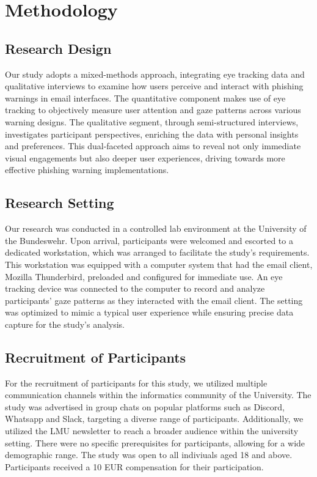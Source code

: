 \documentclass[
  a4paper,  %
  twoside,  %
  bibliography=totoc,
  headsepline,
  cleardoublepage=empty,
  parskip=half,
  draft=false
]{scrbook}
\begin{document}
\chapter{Methodology}
\label{sec:methodology}
\section{Research Design}
Our study adopts a mixed-methods approach, integrating eye tracking data and qualitative interviews to examine how users perceive and interact with phishing warnings in email interfaces. The quantitative component makes use of eye tracking to objectively measure user attention and gaze patterns across various warning designs. The qualitative segment, through semi-structured interviews, investigates participant perspectives, enriching the data with personal insights and preferences. This dual-faceted approach aims to reveal not only immediate visual engagements but also deeper user experiences, driving towards more effective phishing warning implementations. 

\section{Research Setting}
Our research was conducted in a controlled lab environment at the University of the Bundeswehr. Upon arrival, participants were welcomed and escorted to a dedicated workstation, which was arranged to facilitate the study's requirements. This workstation was equipped with a computer system that had the email client, Mozilla Thunderbird, preloaded and configured for immediate use. An eye tracking device was connected to the computer to record and analyze participants' gaze patterns as they interacted with the email client. The setting was optimized to mimic a typical user experience while ensuring precise data capture for the study's analysis.

\section{Recruitment of Participants}
For the recruitment of participants for this study, we utilized multiple communication channels within the informatics community of the University. The study was advertised in group chats on popular platforms such as Discord, Whatsapp and Slack, targeting a diverse range of participants. Additionally, we utilized the LMU newsletter to reach a broader audience within the university setting. There were no specific prerequisites for participants, allowing for a wide demographic range. The study was open to all indiviuals aged 18 and above. Participants received a 10 EUR compensation for their participation.
\end{document}
